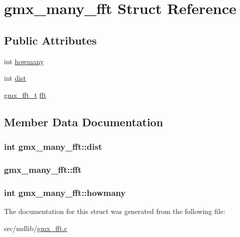 \hypertarget{structgmx__many__fft}{\section{gmx\-\_\-many\-\_\-fft \-Struct \-Reference}
\label{structgmx__many__fft}
}
\subsection*{\-Public \-Attributes}
\begin{DoxyCompactItemize}
\item 
int \hyperlink{structgmx__many__fft_a45ec87f1a16ae0493822bb915b4fd469}{howmany}
\item 
int \hyperlink{structgmx__many__fft_a5f40bf0c077e67d6a38072572b80ec00}{dist}
\item 
\hyperlink{include_2gmx__fft_8h_ac4aa41b4b80187da5d55a98e5f63a025}{gmx\-\_\-fft\-\_\-t} \hyperlink{structgmx__many__fft_a7bd3792596e2470331a81fb6d1882809}{fft}
\end{DoxyCompactItemize}


\subsection{\-Member \-Data \-Documentation}
\hypertarget{structgmx__many__fft_a5f40bf0c077e67d6a38072572b80ec00}{
\subsubsection[{dist}]{\setlength{\rightskip}{0pt plus 5cm}int {\bf gmx\-\_\-many\-\_\-fft\-::dist}}}\label{structgmx__many__fft_a5f40bf0c077e67d6a38072572b80ec00}
\hypertarget{structgmx__many__fft_a7bd3792596e2470331a81fb6d1882809}{
\subsubsection[{fft}]{ {\bf gmx\-\_\-many\-\_\-fft\-::fft}}}\label{structgmx__many__fft_a7bd3792596e2470331a81fb6d1882809}
\hypertarget{structgmx__many__fft_a45ec87f1a16ae0493822bb915b4fd469}{
\subsubsection[{howmany}]{\setlength{\rightskip}{0pt plus 5cm}int {\bf gmx\-\_\-many\-\_\-fft\-::howmany}}}\label{structgmx__many__fft_a45ec87f1a16ae0493822bb915b4fd469}


\-The documentation for this struct was generated from the following file\-:\begin{DoxyCompactItemize}
\item 
src/mdlib/\hyperlink{gmx__fft_8c}{gmx\-\_\-fft.\-c}\end{DoxyCompactItemize}
